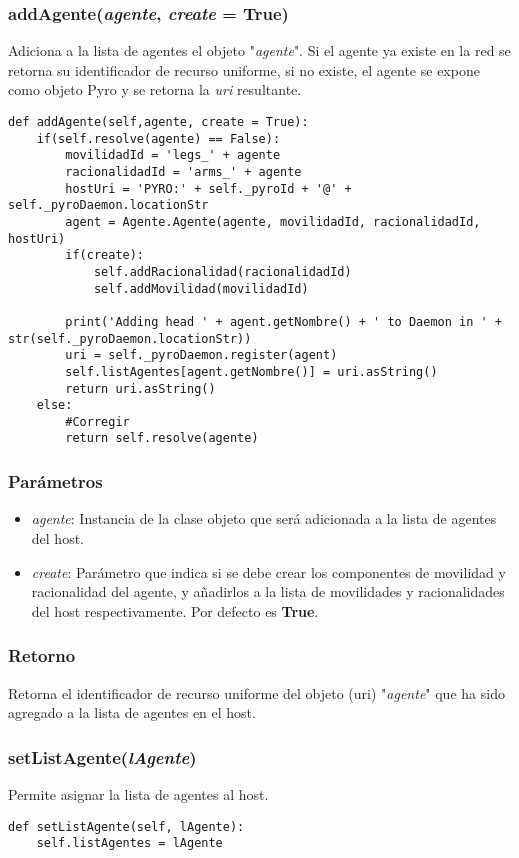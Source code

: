 \documentclass{article}
\begin{document}
\subsubsection{\textbf{addAgente}(\textit{agente}, \textit{create} = \textbf{True})}
Adiciona a la lista de agentes el objeto "\textit{agente}". Si el agente ya existe en la red se retorna su identificador de recurso uniforme, si no existe, el agente se expone como objeto Pyro y se retorna la \textit{uri} resultante.
\begin{lstlisting}
def addAgente(self,agente, create = True):
	if(self.resolve(agente) == False):
		movilidadId = 'legs_' + agente
		racionalidadId = 'arms_' + agente
		hostUri = 'PYRO:' + self._pyroId + '@' + self._pyroDaemon.locationStr
		agent = Agente.Agente(agente, movilidadId, racionalidadId, hostUri)
		if(create):
			self.addRacionalidad(racionalidadId)
			self.addMovilidad(movilidadId)

		print('Adding head ' + agent.getNombre() + ' to Daemon in ' + str(self._pyroDaemon.locationStr))
		uri = self._pyroDaemon.register(agent)
		self.listAgentes[agent.getNombre()] = uri.asString()
		return uri.asString()
	else:
		#Corregir
		return self.resolve(agente)
\end{lstlisting}
\subsubsection*{Parámetros}
\begin{itemize}
\item \textit{agente}: Instancia de la clase objeto que será adicionada a la lista de agentes del host.
\item \textit{create}: Parámetro que indica si se debe crear los componentes de movilidad y racionalidad del agente, y añadirlos a la lista de movilidades y racionalidades del host respectivamente. Por defecto es \textbf{True}.
\end{itemize}
\subsubsection*{Retorno}
Retorna el identificador de recurso uniforme del objeto (uri) "\textit{agente}" que ha sido agregado a la lista de agentes en el host.
\subsubsection{\textbf{setListAgente}(\textit{lAgente})}
Permite asignar la lista de agentes al host.
\begin{lstlisting}
def setListAgente(self, lAgente):
	self.listAgentes = lAgente
\end{lstlisting}
\end{document}
